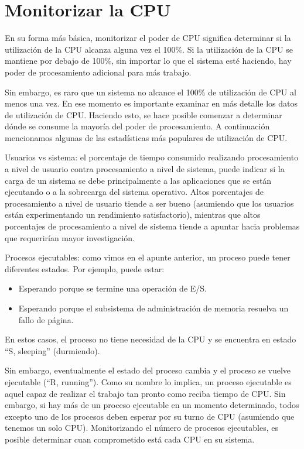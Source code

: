 \documentclass[12pt]{article}
\begin{document}
\section*{Monitorizar la CPU}
En su forma más básica, monitorizar el poder de CPU significa determinar si
 la utilización de la CPU alcanza alguna vez el 100\%. Si la utilización 
de la CPU se mantiene por debajo de 100\%, sin importar lo que el sistema 
esté haciendo, hay poder de procesamiento adicional para más trabajo.

Sin embargo, es raro que un sistema no alcance el 100\% de utilización de 
CPU al menos una vez. En ese momento es importante examinar en más detalle 
los datos de utilización de CPU. Haciendo esto, se hace posible comenzar a 
determinar dónde se consume la mayoría del poder de procesamiento. A 
continuación mencionamos algunas de las estadísticas más populares de 
utilización de CPU.

Usuarios vs sistema: el porcentaje de tiempo consumido realizando 
procesamiento a nivel de usuario contra procesamiento a nivel de sistema, 
puede indicar si la carga de un sistema se debe principalmente a las 
aplicaciones que se están ejecutando o a la sobrecarga del sistema 
operativo. Altos porcentajes de procesamiento a nivel de usuario tiende a 
ser bueno (asumiendo que los usuarios están experimentando un rendimiento
satisfactorio), mientras que altos porcentajes de procesamiento a nivel de 
sistema tiende a apuntar hacia problemas que requerirían mayor 
investigación.

Procesos ejecutables: como vimos en el apunte anterior, un proceso puede 
tener diferentes estados. Por ejemplo, puede estar:
\begin{itemize}
\item Esperando porque se termine una operación de E/S.
\item Esperando porque el subsistema de administración de memoria 
resuelva un fallo de página.
\end{itemize}
En estos casos, el proceso no tiene necesidad de la CPU y se encuentra en
estado ``S, sleeping'' (durmiendo).  

Sin embargo, eventualmente el estado del proceso cambia y el proceso se 
vuelve ejecutable (``R, running''). Como su nombre lo implica, un proceso 
ejecutable es aquel capaz de realizar el trabajo tan pronto como reciba 
tiempo de CPU. Sin embargo, si hay más de un proceso ejecutable en un 
momento determinado, todos excepto uno de los procesos deben esperar por su 
turno de CPU (asumiendo que tenemos un solo CPU). Monitorizando el
número de procesos ejecutables, es posible determinar cuan comprometido 
está cada CPU en su sistema.
\end{document}
